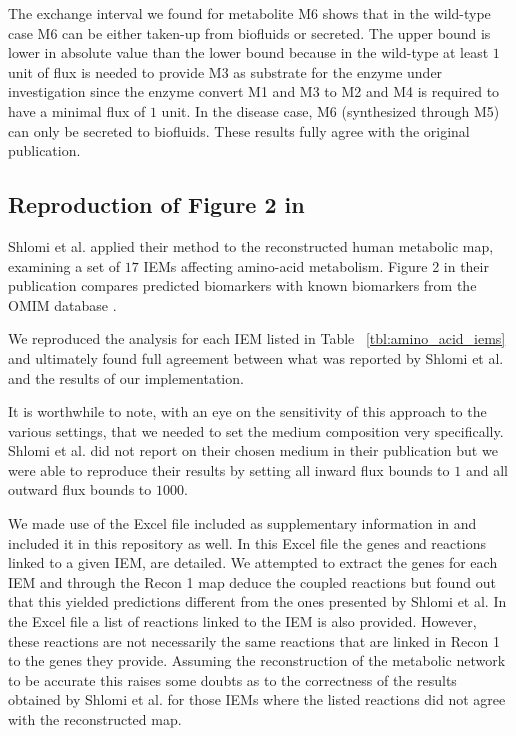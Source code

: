 \documentclass[10pt,a4paper,onecolumn]{article}
\begin{document}
The exchange interval we found for metabolite M6 shows that in the
wild-type case M6 can be either taken-up from biofluids or secreted. The
upper bound is lower in absolute value than the lower bound because in
the wild-type at least \(1\) unit of flux is needed to provide M3 as
substrate for the enzyme under investigation since the enzyme convert M1
and M3 to M2 and M4 is required to have a minimal flux of \(1\) unit. In
the disease case, M6 (synthesized through M5) can only be secreted to
biofluids. These results fully agree with the original publication.

\subsection{\texorpdfstring{Reproduction of Figure 2 in
\autocite{Shlomi2009}}{Reproduction of Figure 2 in {[}@Shlomi2009{]}}}\label{reproduction-of-figure-2-in-shlomi2009}

Shlomi et al. applied their method to the reconstructed human metabolic
map, examining a set of \(17\) IEMs affecting amino-acid metabolism.
Figure 2 in their publication compares predicted biomarkers with known
biomarkers from the OMIM database \autocite{McKusick2007}.

We reproduced the analysis for each IEM listed in Table
~\ref{tbl:amino_acid_iems} and ultimately found full agreement between
what was reported by Shlomi et al. and the results of our
implementation.

It is worthwhile to note, with an eye on the sensitivity of this
approach to the various settings, that we needed to set the medium
composition very specifically. Shlomi et al. did not report on their
chosen medium in their publication but we were able to reproduce their
results by setting all inward flux bounds to \(1\) and all outward flux
bounds to \(1000\).

We made use of the Excel file included as supplementary information in
\autocite{Shlomi2009} and included it in this repository as well. In
this Excel file the genes and reactions linked to a given IEM, are
detailed. We attempted to extract the genes for each IEM and through the
Recon 1 map deduce the coupled reactions but found out that this yielded
predictions different from the ones presented by Shlomi et al. In the
Excel file a list of reactions linked to the IEM is also provided.
However, these reactions are not necessarily the same reactions that are
linked in Recon 1 to the genes they provide. Assuming the reconstruction
of the metabolic network to be accurate this raises some doubts as to
the correctness of the results obtained by Shlomi et al. for those IEMs
where the listed reactions did not agree with the reconstructed map.
\end{document}
